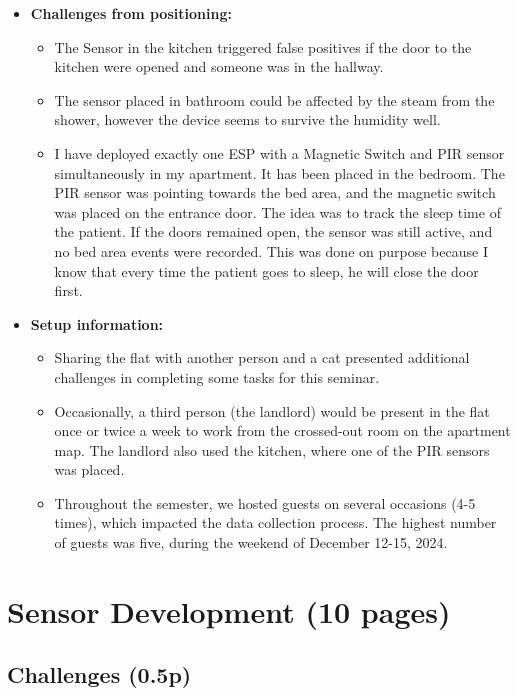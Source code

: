 \documentclass[A4,10pt]{article}
\begin{document}
\begin{itemize}
	\item \textbf{Challenges from positioning:}
	\begin{itemize}
		\item The Sensor in the kitchen triggered false positives if the door to the kitchen were opened and someone was in the hallway. 
		\item The sensor placed in bathroom could be affected by the steam from the shower, however the device seems to survive the humidity well.
		\item I have deployed exactly one ESP with a Magnetic Switch and PIR sensor simultaneously in my apartment. It has been placed in the bedroom. The PIR sensor was pointing towards the bed area, and the magnetic switch was placed on the entrance door. The idea was to track the sleep time of the patient. If the doors remained open, the sensor was still active, and no bed area events were recorded. This was done on purpose because I know that every time the patient goes to sleep, he will close the door first.
	\end{itemize}
	\item \textbf{Setup information:}
	\begin{itemize}
		\item Sharing the flat with another person and a cat presented additional challenges in completing some tasks for this seminar.
		\item Occasionally, a third person (the landlord) would be present in the flat once or twice a week to work from the crossed-out room on the apartment map. The landlord also used the kitchen, where one of the PIR sensors was placed.
		\item Throughout the semester, we hosted guests on several occasions (4-5 times), which impacted the data collection process. The highest number of guests was five, during the weekend of December 12-15, 2024.
	\end{itemize}
\end{itemize}

\section{Sensor Development (10 pages)}

\subsection{Challenges (0.5p)}
\end{document}
